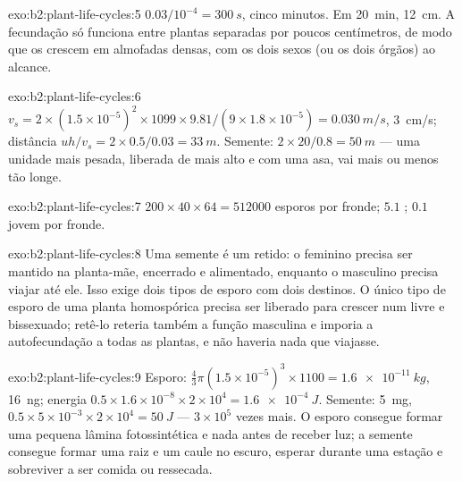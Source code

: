 \begin{solution}{exo:b2:plant-life-cycles:5}
$0.03/10^{-4} = \qty{300}{s}$, cinco minutos. Em \qty{20}{min},
\qty{12}{cm}. A fecundação só funciona entre plantas separadas por
poucos centímetros, de modo que os  crescem em almofadas densas,
com os dois sexos (ou os dois órgãos) ao alcance.
\end{solution}

\begin{solution}{exo:b2:plant-life-cycles:6}
$v_s = 2\times(1.5\times 10^{-5})^2\times 1099\times 9.81/(9\times
1.8\times 10^{-5}) = \qty{0.030}{m/s}$, \qty{3}{cm/s}; distância
$uh/v_s
= 2\times 0.5/0.03 = \qty{33}{m}$. Semente: $2\times 20/0.8 =
\qty{50}{m}$ --- uma unidade mais pesada, liberada de mais alto e com
uma asa, vai mais ou menos tão longe.
\end{solution}

\begin{solution}{exo:b2:plant-life-cycles:7}
$200\times 40\times 64 = \num{512000}$ esporos por fronde; $5.1$
; $0.1$  jovem por fronde.
\end{solution}

\begin{solution}{exo:b2:plant-life-cycles:8}
Uma semente é um  retido: o  feminino precisa ser
mantido na planta-mãe, encerrado e alimentado, enquanto o 
masculino precisa viajar até ele. Isso exige dois tipos de esporo com
dois destinos. O único tipo de esporo de uma planta homospórica precisa
ser liberado para crescer num  livre e bissexuado; retê-lo
reteria também a função masculina e imporia a autofecundação a todas
as plantas, e não haveria nada que viajasse.
\end{solution}

\begin{solution}{exo:b2:plant-life-cycles:9}
Esporo: $\tfrac43\pi(1.5\times 10^{-5})^3\times 1100 =
\qty{1.6e-11}{kg}$, \qty{16}{ng}; energia $0.5\times 1.6\times
10^{-8}\times 2\times 10^{4} = \qty{1.6e-4}{J}$. Semente: \qty{5}{mg},
$0.5\times 5\times 10^{-3}\times 2\times 10^{4} = \qty{50}{J}$ ---
$3\times 10^{5}$ vezes mais. O esporo consegue formar uma pequena
lâmina fotossintética e nada antes de receber luz; a semente consegue
formar uma raiz e um caule no escuro, esperar durante uma estação e
sobreviver a ser comida ou ressecada.
\end{solution}

